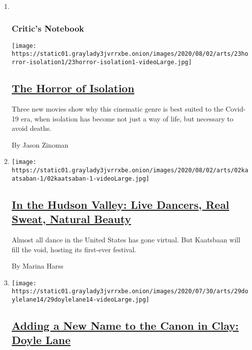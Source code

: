 \begin{enumerate}
\def\labelenumi{\arabic{enumi}.}
\item ~
  \hypertarget{critics-notebook-1}{%
  \subsubsection{Critic's Notebook}\label{critics-notebook-1}}

  \texttt{[image: https://static01.graylady3jvrrxbe.onion/images/2020/08/02/arts/23horror-isolation1/23horror-isolation1-videoLarge.jpg]}

  \hypertarget{the-horror-of-isolation}{%
  \subsection{\texorpdfstring{\href{/2020/07/29/movies/horror-she-dies-tomorrow-relic-amulet.html}{The
  Horror of
  Isolation}}{The Horror of Isolation}}\label{the-horror-of-isolation}}

  Three new movies show why this cinematic genre is best suited to the
  Covid-19 era, when isolation has become not just a way of life, but
  necessary to avoid deaths.

  By Jason Zinoman
\item
  \texttt{[image: https://static01.graylady3jvrrxbe.onion/images/2020/08/02/arts/02kaatsaban-1/02kaatsaban-1-videoLarge.jpg]}

  \hypertarget{in-the-hudson-valley-live-dancers-real-sweat-natural-beauty}{%
  \subsection{\texorpdfstring{\href{/2020/07/29/arts/dance/kaatsbaan-dance-festival-stella-abrera.html}{In
  the Hudson Valley: Live Dancers, Real Sweat, Natural
  Beauty}}{In the Hudson Valley: Live Dancers, Real Sweat, Natural Beauty}}\label{in-the-hudson-valley-live-dancers-real-sweat-natural-beauty}}

  Almost all dance in the United States has gone virtual. But Kaatsbaan
  will fill the void, hosting its first-ever festival.

  By Marina Harss
\item
  \texttt{[image: https://static01.graylady3jvrrxbe.onion/images/2020/07/30/arts/29doylelane14/29doylelane14-videoLarge.jpg]}

  \hypertarget{adding-a-new-name-to-the-canon-in-clay-doyle-lane}{%
  \subsection{\texorpdfstring{\href{/2020/07/29/arts/design/doyle-lane-ceramics.html}{Adding
  a New Name to the Canon in Clay: Doyle
  Lane}}{Adding a New Name to the Canon in Clay: Doyle Lane}}\label{adding-a-new-name-to-the-canon-in-clay-doyle-lane}}


\end{enumerate}
